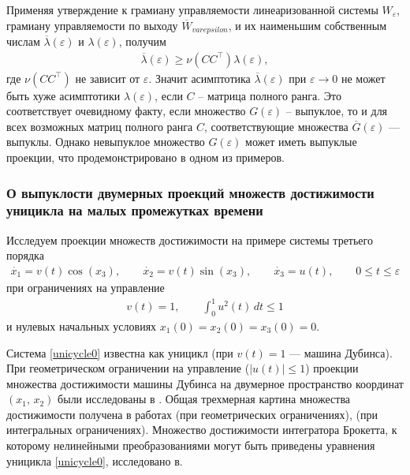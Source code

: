 \documentclass[../main.tex]{subfiles}
\begin{document}
    Применяя утверждение к грамиану управляемости линеаризованной системы $ W_{\varepsilon} $, грамиану управляемости по выходу $ \overline{W}_{varepsilon}$, и их наименьшим собственным числам $ \overline{\lambda}(\varepsilon) $ и $ \lambda(\varepsilon) $, получим
    \begin{gather*}
        \overline{\lambda}(\varepsilon) \geqslant \nu(CC^{\top}) \lambda(\varepsilon),
    \end{gather*}
    где $ \nu(CC^{\top}) $ не зависит от $ \varepsilon $. 
    Значит асимптотика $ \overline{\lambda}(\varepsilon) $ при $\varepsilon \rightarrow 0$ не может быть хуже асимптотики $ \lambda(\varepsilon) $, если $ C $ -- матрица полного ранга. 
    Это соответствует очевидному факту, если множество $ G(\varepsilon) $ -- выпуклое, то и для всех возможных матриц полного ранга $ C $, соответствующие множества $ \overline{G}(\varepsilon) $ --- выпуклы. 
    Однако невыпуклое множество $ G(\varepsilon) $  может иметь выпуклые проекции, что продемонстрировано в одном из примеров.
    
\subsubsection{О выпуклости двумерных проекций множеств достижимости уницикла на малых промежутках времени}    
    Исследуем проекции множеств достижимости на примере системы третьего порядка
    \begin{gather}\label{unicycle0}
        \dot{x_1} = v(t)\cos(x_3), \qquad
        \dot{x_2} = v(t)\sin(x_3), \qquad
        \dot{x_3} = u(t), \qquad 0 \leqslant t \leqslant \varepsilon
    \end{gather}
    при ограничениях на управление 
    \begin{gather*}
        v(t) = 1, \qquad \int_0^1 u^2(t) \, dt \leqslant 1
    \end{gather*}
    и нулевых начальных условиях $ x_1(0) = x_2(0) = x_3(0) = 0 $.
    
    Система \eqref{unicycle0} известна как уницикл (при $ v(t) = 1$  --- машина Дубинса). При геометрическом
    ограничении на
    управление ($|u(t)|\leqslant 1$) проекции множества достижимости  машины Дубинса  на двумерное пространство координат $(x_1,\,x_2)$ были исследованы в
    \cite{Cockayne}. Общая трехмерная картина множества достижимости получена в
    работах \cite{Patsko} (при геометрических ограничениях), \cite{Patsko2023} (при интегральных ограничениях). Множество достижимости интегратора Брокетта, к которому нелинейными преобразованиями могут быть приведены уравнения уницикла \eqref{unicycle0}, исследовано в\cite{Vdovin}.
    
\end{document}
